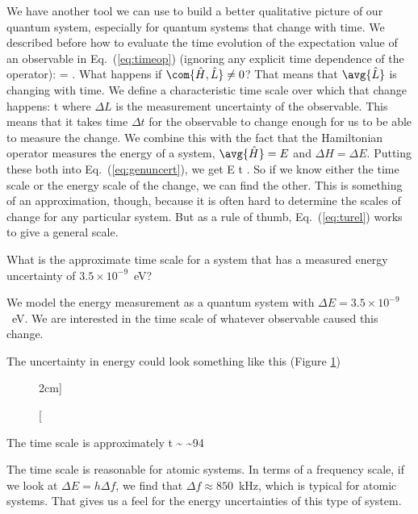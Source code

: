 We have another tool we can use to build a better qualitative picture of our quantum system, especially for quantum systems that change with time. We described before how to evaluate the time evolution of the expectation value of an observable in Eq.~(\ref{eq:timeop}) (ignoring any explicit time dependence of the operator):
\beq
{}  =  \frac{\I}{\hbar}.
\eeq
What happens if $\com{\hat{H},\hat{L}}\neq0$? That means that $\avg{\hat{L}}$ is changing with time. We define a characteristic time scale over which that change happens:
\beq
\Delta t \equiv {}
\eeq
where $\Delta L$ is the measurement uncertainty of the observable. This means that it takes time $\Delta t$ for the observable to change enough for us to be able to measure the change. We combine this with the fact that the Hamiltonian operator measures the energy of a system, $\avg{\hat{H}} = E$ and $\Delta H = \Delta E$. Putting these both into Eq.~(\ref{eq:genuncert}), we get
%
\beq
\Delta E \Delta t \geq {}.
\label{eq:turel}
\eeq 
{}
%
So if we know either the time scale or the energy scale of the change, we can find the other. This is something of an approximation, though, because it is often hard to determine the scales of change for any particular system. But as a rule of thumb, Eq.~(\ref{eq:turel}) works to give a general scale.
\begin{example}
What is the approximate time scale for a system that has a measured energy uncertainty of $3.5\times10^{-9}$~eV?

\model We model the energy measurement as a quantum system with $\Delta E=3.5\times10^{-9}$~eV. We are interested in the time scale of whatever observable caused this change.

\vis The uncertainty in energy could look something like this (Figure \ref{fig:samplefig1})
\begin{figure}
\centering
{}
\caption[][2cm]{ }
\label{fig:samplefig1}
\end{figure}

\sol The time scale is approximately 
\beq
\Delta t \sim {} \sim 94\;
\eeq

\assess The time scale is reasonable for atomic systems. In terms of a frequency scale, if we look at $\Delta E = h\Delta f$, we find that $\Delta f \approx 850$~kHz, which is typical for atomic systems. That gives us a feel for the energy uncertainties of this type of system.

\end{example}

